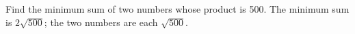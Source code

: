 {Find the minimum sum of two numbers whose product is 500.
}
{The minimum sum is $2\sqrt{500}$; the two numbers are each $\sqrt{500}$.
}

